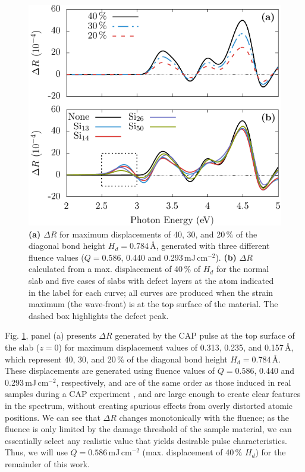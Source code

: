 \documentclass[aps,prb,10pt,showkeys,letterpaper,notitlepage,twocolumn]{revtex4-1}
\begin{document}
\begin{figure}[b]
\includegraphics[width=\linewidth]{fig02}
\caption{\textbf{(a)} $\Delta R$ for maximum displacements of 40, 30, and 20\,\%
of the diagonal bond height $H_{d} = 0.784$\,\r{A}, generated with three
different fluence values ($Q = 0.586$, 0.440 and 0.293\,mJ\,cm$^{-2}$).
\textbf{(b)} $\Delta R$ calculated from a max. displacement of 40\,\% of $H_{d}$
for the normal slab and five cases of slabs with defect layers at the atom
indicated in the label for each curve; all curves are produced when the strain
maximum (the wave-front) is at the top surface of the material. The dashed box
highlights the defect peak.}
\label{fig:diffs}
\end{figure}

Fig. \ref{fig:diffs}, panel (a) presents $\Delta R$ generated by the CAP pulse
at the top surface of the slab ($z = 0$) for maximum displacement values of
0.313, 0.235, and 0.157\,\r{A}, which represent 40, 30, and 20\,\% of the
diagonal bond height $H_{d} = 0.784$\,\r{A}. These displacements are generated
using fluence values of $Q = 0.586$, 0.440 and 0.293\,mJ\,cm$^{-2}$,
respectively, and are of the same order as those induced in real samples during
a CAP experiment \cite{lawlerMRE14}, and are large enough to create clear
features in the spectrum, without creating spurious effects from overly
distorted atomic positions. We can see that $\Delta R$ changes monotonically
with the fluence; as the fluence is only limited by the damage threshold of the
sample material, we can essentially select any realistic value that yields
desirable pulse characteristics. Thus, we will use $Q = 0.586$\,mJ\,cm$^{-2}$
(max. displacement of 40\,\% $H_{d}$) for the remainder of this work.
\end{document}
